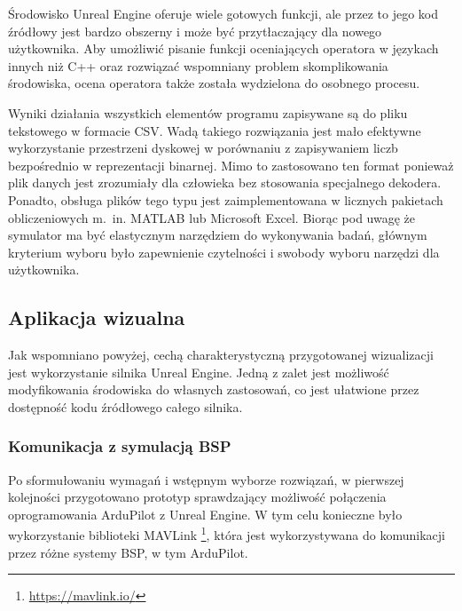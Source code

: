 Środowisko Unreal Engine oferuje wiele gotowych funkcji, ale przez to jego kod źródłowy jest bardzo obszerny i może być przytłaczający dla nowego użytkownika. Aby umożliwić pisanie funkcji oceniających operatora w językach innych niż C++ oraz rozwiązać wspomniany problem skomplikowania środowiska, ocena operatora także została wydzielona do osobnego procesu.

Wyniki działania wszystkich elementów programu zapisywane są do pliku tekstowego w formacie CSV\cite{rfc4180}. Wadą takiego rozwiązania jest mało efektywne wykorzystanie przestrzeni dyskowej w porównaniu z zapisywaniem liczb bezpośrednio w reprezentacji binarnej. Mimo to zastosowano ten format ponieważ plik danych jest zrozumiały dla człowieka bez stosowania specjalnego dekodera. Ponadto, obsługa plików tego typu jest zaimplementowana w licznych pakietach obliczeniowych m.~in. MATLAB lub Microsoft Excel. Biorąc pod uwagę że symulator ma być elastycznym narzędziem do wykonywania badań, głównym kryterium wyboru było zapewnienie czytelności i swobody wyboru narzędzi dla użytkownika.

\subsection{Aplikacja wizualna}

Jak wspomniano powyżej, cechą charakterystyczną przygotowanej wizualizacji jest wykorzystanie silnika Unreal Engine. Jedną z zalet jest możliwość modyfikowania środowiska do własnych zastosowań, co jest ułatwione przez dostępność kodu źródłowego całego silnika.

\subsubsection{Komunikacja z symulacją BSP}
\label{sec:komunikacja}

Po sformułowaniu wymagań i wstępnym wyborze rozwiązań, w pierwszej kolejności przygotowano prototyp sprawdzający możliwość połączenia oprogramowania ArduPilot z Unreal Engine. W tym celu konieczne było wykorzystanie biblioteki MAVLink \footnote{\url{https://mavlink.io/}}, która jest wykorzystywana do komunikacji przez różne systemy BSP, w tym ArduPilot.

